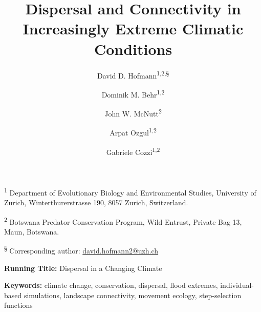 \documentclass[abstract=on,10pt,a4paper,bibliography=totocnumbered]{article}
\title{Dispersal and Connectivity in Increasingly Extreme Climatic Conditions}
\author{
  David D. Hofmann\textsuperscript{1,2,\S} \orcid{0000-0003-3477-4365} \and
  Dominik M. Behr\textsuperscript{1,2} \orcid{0000-0001-7378-8538} \and
  John W. McNutt\textsuperscript{2} \and
  Arpat Ozgul\textsuperscript{1,2} \orcid{0000-0001-7477-2642} \and
  Gabriele Cozzi\textsuperscript{1,2} \orcid{0000-0002-1744-1940}
}
\begin{document}

\maketitle

\begin{flushleft}

\vspace{0.5cm}

\textsuperscript{1} Department of Evolutionary Biology and Environmental
Studies, University of Zurich, Winterthurerstrasse 190, 8057 Zurich,
Switzerland.

\textsuperscript{2} Botswana Predator Conservation Program, Wild Entrust,
Private Bag 13, Maun, Botswana.

\textsuperscript{\S} Corresponding author: \href{mailto://david.hofmann2@uzh.ch}{david.hofmann2@uzh.ch}

\vspace{4cm}

\textbf{Running Title:} Dispersal in a Changing Climate

\vspace{0.5cm}

\textbf{Keywords:} climate change, conservation, dispersal, flood extremes,
individual-based simulations, landscape connectivity, movement ecology,
step-selection functions

\end{flushleft}
\end{document}
